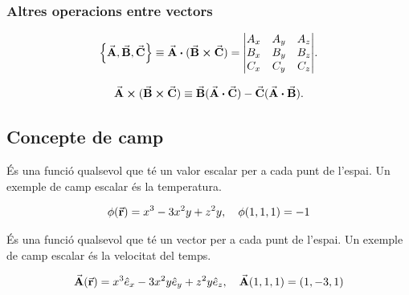 \subsubsection*{Altres operacions entre vectors}
\begin{defi}
	\begin{align}
		\qty{ \va{A}, \va{B}, \va{C} } \equiv \va{A} \vdot (\va{B} \cross \va{C}) = \mqty| A_{x} & A_{y} & A_{z} \\ B_{x} & B_{y} & B_{z} \\ C_{x} & C_{y} & C_{z} |.
	\end{align}
\end{defi}
\begin{defi}
	\begin{align}
		\va{A} \cross (\va{B} \cross \va{C}) \equiv \va{B} (\va{A} \vdot \va{C}) - \va{C} (\va{A} \vdot \va{B}).
	\end{align}
\end{defi}

\subsection{Concepte de camp}
\begin{defi}
	És una funció qualsevol que té un valor escalar per a cada punt de l'espai. Un exemple de camp escalar és la temperatura.
\end{defi}
\begin{example}
	\begin{align*}
		\phi (\va{r}) = x^{3} - 3x^{2}y + z^{2}y, \quad \phi (1,1,1) = -1
	\end{align*}
\end{example}

\begin{defi}
	És una funció qualsevol que té un vector per a cada punt de l'espai. Un exemple de camp escalar és la velocitat del temps.
\end{defi}
\begin{example}
	\begin{align*}
		\va{A} (\va{r}) = x^{3} \hat{e}_{x} - 3x^{2}y \hat{e}_{y} + z^{2}y \hat{e}_{z}, \quad \va{A} (1,1,1) = (1,-3,1)
	\end{align*}
\end{example}

